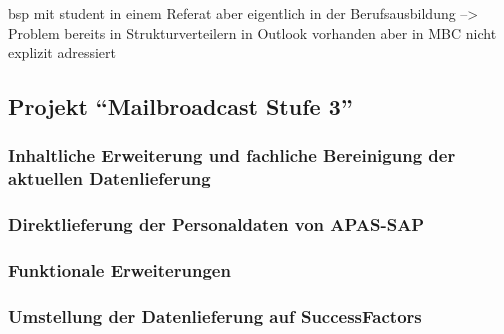 bsp mit student in einem Referat aber eigentlich in der Berufsausbildung --> Problem bereits in Strukturverteilern in Outlook vorhanden
aber in MBC nicht explizit adressiert


\subsection{Projekt \enquote{Mailbroadcast Stufe 3}}

\subsubsection{Inhaltliche Erweiterung und fachliche Bereinigung der aktuellen Datenlieferung}
\subsubsection{Direktlieferung der Personaldaten von APAS-SAP} %
\subsubsection{Funktionale Erweiterungen}
\subsubsection{Umstellung der Datenlieferung auf SuccessFactors}